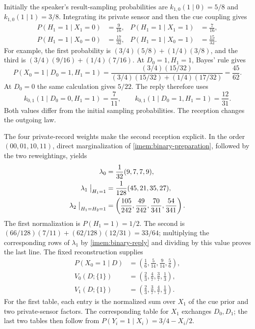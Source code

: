 Initially the speaker's result-sampling probabilities are $k_{1,0}(1\mid0)=5/8$ and $k_{1,0}(1\mid1)=3/8$. Integrating its private sensor and then the cue coupling gives
\begin{equation}
 \begin{aligned}
 P(H_1=1\mid X_1=0)&=\frac9{16},&
 P(H_1=1\mid X_1=1)&=\frac7{16},\\
 P(H_1=1\mid X_0=0)&=\frac{17}{32},&
 P(H_1=1\mid X_0=1)&=\frac{15}{32}.
 \end{aligned}
 \label{imem:binary-first-likelihood}
\end{equation}
For example, the first probability is $(3/4)(5/8)+(1/4)(3/8)$, and the third is $(3/4)(9/16)+(1/4)(7/16)$. At $D_0=1,H_1=1$, Bayes' rule gives
\begin{equation}
 P(X_0=1\mid D_0=1,H_1=1)
 =\frac{(3/4)(15/32)}{(3/4)(15/32)+(1/4)(17/32)}
 =\frac{45}{62}.
 \label{imem:binary-first-posterior}
\end{equation}
At $D_0=0$ the same calculation gives $5/22$. The reply therefore uses
\begin{equation}
 k_{0,1}(1\mid D_0=0,H_1=1)=\frac7{11},\qquad
 k_{0,1}(1\mid D_0=1,H_1=1)=\frac{12}{31}.
 \label{imem:binary-reply}
\end{equation}
Both values differ from the initial sampling probabilities. The reception changes the outgoing law.

The four private-record weights make the second reception explicit. In the order $(00,01,10,11)$, direct marginalization of \cref{imem:binary-preparation}, followed by the two reweightings, yields
\begin{equation}
 \begin{aligned}
 \lambda_0&=\frac1{32}(9,7,7,9),\\
 \lambda_1\bigm|_{H_1=1}&=\frac1{128}(45,21,35,27),\\
 \lambda_2\bigm|_{H_1=H_2=1}
 &=\left(\frac{105}{242},\frac{49}{242},\frac{70}{341},\frac{54}{341}\right).
 \end{aligned}
 \label{imem:binary-private-weights}
\end{equation}
The first normalization is $P(H_1=1)=1/2$. The second is
$(66/128)(7/11)+(62/128)(12/31)=33/64$; multiplying the corresponding rows of $\lambda_1$ by \cref{imem:binary-reply} and dividing by this value proves the last line. The fixed reconstruction supplies
\begin{equation}
 \begin{aligned}
 P(X_0=1\mid D)&=\left(\frac16,\frac5{14},\frac9{14},\frac56\right),\\
 V_0(D;\{1\})&=\left(\frac23,\frac47,\frac37,\frac13\right),\\
 V_1(D;\{1\})&=\left(\frac23,\frac37,\frac47,\frac13\right).
 \end{aligned}
 \label{imem:binary-reconstruction}
\end{equation}
For the first table, each entry is the normalized sum over $X_1$ of the cue prior and two private-sensor factors. The corresponding table for $X_1$ exchanges $D_0,D_1$; the last two tables then follow from $P(Y_i=1\mid X_i)=3/4-X_i/2$.

